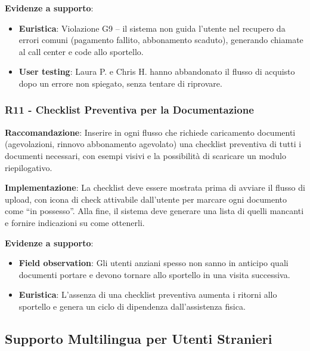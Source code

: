 ﻿\documentclass[11pt,a4paper]{article}
\begin{document}
\textbf{Evidenze a supporto}:
\begin{itemize}
    \item \textbf{Euristica}: Violazione G9 -- il sistema non guida l'utente
    nel recupero da errori comuni (pagamento fallito, abbonamento scaduto),
    generando chiamate al call center e code allo sportello.
    \item \textbf{User testing}: Laura P. e Chris H. hanno abbandonato
    il flusso di acquisto dopo un errore non spiegato, senza tentare
    di riprovare.
\end{itemize}

\subsubsection{R11 - Checklist Preventiva per la Documentazione}
\label{rec:R11}

\textbf{Raccomandazione}: Inserire in ogni flusso che richiede caricamento
documenti (agevolazioni, rinnovo abbonamento agevolato) una checklist
preventiva di tutti i documenti necessari, con esempi visivi e la possibilit\`a
di scaricare un modulo riepilogativo.

\textbf{Implementazione}: La checklist deve essere mostrata prima di avviare
il flusso di upload, con icona di check attivabile dall'utente per marcare
ogni documento come “in possesso”. Alla fine, il sistema deve generare una
lista di quelli mancanti e fornire indicazioni su come ottenerli.

\textbf{Evidenze a supporto}:
\begin{itemize}
    \item \textbf{Field observation}: Gli utenti anziani spesso non sanno in
    anticipo quali documenti portare e devono tornare allo sportello in una
    visita successiva.
    \item \textbf{Euristica}: L'assenza di una checklist preventiva aumenta
    i ritorni allo sportello e genera un ciclo di dipendenza dall'assistenza
    fisica.
\end{itemize}



\subsection{Supporto Multilingua per Utenti Stranieri}
\end{document}
